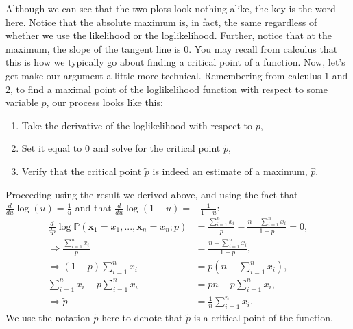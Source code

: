 \documentclass[letterpaper,10pt,english]{jupyterBook}
\begin{document}
\noindent{}

\sphinxAtStartPar
Although we can see that the two plots look  nothing alike, the key is the word  here. Notice that the absolute maximum is, in fact, the same regardless of whether we use the likelihood or the log\sphinxhyphen{}likelihood. Further, notice that at the maximum, the slope of the tangent line is \(0\). You may recall from calculus that this is how we typically go about finding a critical point of a function. Now, let’s get make our argument a little more technical. Remembering from calculus \(1\) and \(2\), to find a maximal point of the log\sphinxhyphen{}likelihood function with respect to some variable \(p\), our process looks like this:
\begin{enumerate}
%
\item {} 
\sphinxAtStartPar
Take the derivative of the log\sphinxhyphen{}likelihood with respect to \(p\),

\item {} 
\sphinxAtStartPar
Set it equal to \(0\) and solve for the critical point \(\tilde p\),

\item {} 
\sphinxAtStartPar
Verify that the critical point \(\tilde p\) is indeed an estimate of a maximum, \(\hat p\).

\end{enumerate}

\sphinxAtStartPar
Proceeding using the result we derived above, and using the fact that \(\frac{d}{du} \log(u) = \frac{1}{u}\) and that \(\frac{d}{du} \log(1 - u) = -\frac{1}{1 - u}\):
\begin{align*}
\frac{d}{d p}\log \mathbb P(\mathbf x_1 = x_1, ..., \mathbf x_{n} = x_{n}; p) &= \frac{\sum_{i = 1}^n x_i}{p} - \frac{n - \sum_{i = 1}^n x_i}{1 - p} = 0, \\
\Rightarrow \frac{\sum_{i = 1}^n x_i}{p} &= \frac{n - \sum_{i = 1}^n x_i}{1 - p}, \\
\Rightarrow (1 - p)\sum_{i = 1}^n x_i &= p\left(n - \sum_{i = 1}^n x_i\right), \\
\sum_{i = 1}^n x_i - p\sum_{i = 1}^n x_i &= pn - p\sum_{i = 1}^n x_i ,\\
\Rightarrow \tilde p &= \frac{1}{n}\sum_{i = 1}^n x_i.
\end{align*}
\sphinxAtStartPar
We use the notation \(\tilde p\) here to denote that \(\tilde p\) is a critical point of the function.
\end{document}
